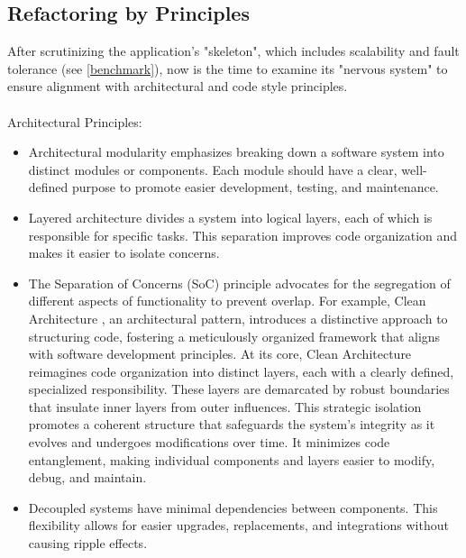 
\subsection{Refactoring by Principles} \label{refactoring}

After scrutinizing the application's "skeleton", which includes scalability and fault tolerance (see \ref{benchmark}), 
now is the time to examine its "nervous system" to ensure alignment with architectural and code style principles.\\
\\

\noindent Architectural Principles:

\begin{itemize}
  \item Architectural modularity \cite{Rich20} emphasizes breaking down a software system into distinct modules or 
  components. Each module should have a clear, well-defined purpose to promote easier development, testing, and 
  maintenance.

  \item Layered architecture \cite{Rich22} divides a system into logical layers, each of which is responsible for 
  specific tasks. This separation improves code organization and makes it easier to isolate concerns.

  \item The Separation of Concerns (SoC) principle advocates for the segregation of different aspects of functionality 
  to prevent overlap. For example, Clean Architecture \cite{Mart18}, an architectural pattern, introduces a distinctive 
  approach to structuring code, fostering a meticulously organized framework that aligns with software development 
  principles. At its core, Clean Architecture reimagines code organization into distinct layers, each with a clearly 
  defined, specialized responsibility. These layers are demarcated by robust boundaries that insulate inner layers from 
  outer influences. This strategic isolation promotes a coherent structure that safeguards the system's integrity as it 
  evolves and undergoes modifications over time. It minimizes code entanglement, making individual components and layers 
  easier to modify, debug, and maintain.

  \item Decoupled systems \cite{Kass05} have minimal dependencies between components. This flexibility allows for easier 
  upgrades, replacements, and integrations without causing ripple effects.
\end{itemize}

